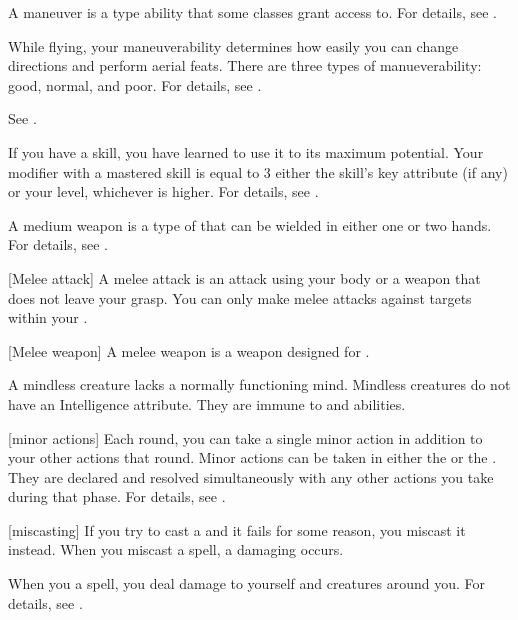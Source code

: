  A maneuver is a type  ability that some classes grant access to.
For details, see .

 While flying, your maneuverability determines how easily you can change directions and perform aerial feats.
There are three types of manueverability: good, normal, and poor.
For details, see .

 See .

 If you have  a skill, you have learned to use it to its maximum potential.
Your modifier with a mastered skill is equal to 3 \add either the skill's key attribute (if any) or your level, whichever is higher.
For details, see .

 A medium weapon is a type of  that can be wielded in either one or two hands.
For details, see .

[Melee attack] A melee attack is an attack using your body or a weapon that does not leave your grasp.
You can only make melee attacks against targets within your .

[Melee weapon] A melee weapon is a weapon designed for .

 A mindless creature lacks a normally functioning mind.
Mindless creatures do not have an Intelligence attribute.
They are immune to  and  abilities.

[minor actions] Each round, you can take a single minor action in addition to your other actions that round.
Minor actions can be taken in either the  or the .
They are declared and resolved simultaneously with any other actions you take during that phase.
For details, see .

[miscasting] If you try to cast a  and it fails for some reason, you miscast it instead.
When you miscast a spell, a damaging  occurs.

 When you  a spell, you deal damage to yourself and creatures around you.
For details, see .

